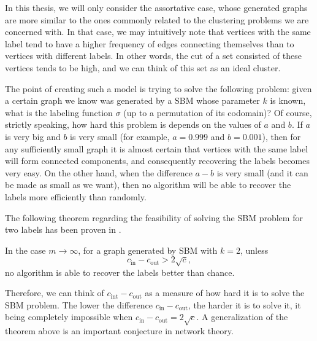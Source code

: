 In this thesis, we will only consider the assortative case, whose generated graphs are more similar to the ones commonly related to the clustering problems we are concerned with.
In that case, we may intuitively note that vertices with the same label tend to have a higher frequency of edges connecting themselves than to vertices with different labels.
In other words, the cut of a set consisted of these vertices tends to be high, and we can think of this set as an ideal cluster.

The point of creating such a model is trying to solve the following problem: given a certain graph we know was generated by a SBM whose parameter $k$ is known, what is the labeling function $\sigma$ (up to a permutation of its codomain)?
Of course, strictly speaking, how hard this problem is depends on the values of $a$ and $b$. 
If $a$ is very big and $b$ is very small (for example, $a = 0.999$ and $b = 0.001$), then for any sufficiently small graph it is almost certain that vertices with the same label will form  connected components, and consequently recovering the labels becomes very easy.
On the other hand, when the difference $a-b$ is very small (and it can be made as small as we want), then no algorithm will be able to recover the labels more efficiently than randomly.

The following theorem regarding the feasibility of solving the SBM problem for two labels has been proven in \cite{ramanujan}. 

\begin{theorem}
In the case $m \rightarrow \infty$, for a graph generated by SBM with $k = 2$, unless
   \begin{equation}
      c_\text{in} - c_\text{out} > 2 \sqrt{c},
   \end{equation}
   no algorithm is able to recover the labels better than chance.
\end{theorem}

Therefore, we can think of $c_\text{int} - c_\text{out}$ as a measure of how hard it is to solve the SBM problem.
The lower the difference $c_\text{in} - c_\text{out}$, the harder it is to solve it, it being completely impossible when $c_\text{in} - c_\text{out} = 2 \sqrt{c}$.
A generalization of the theorem above is an important conjecture in network theory.


